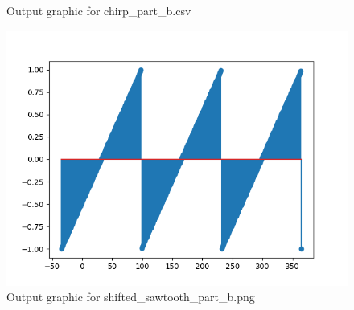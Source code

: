 \documentclass[10pt,a4paper, margin=1in]{article}
\begin{document}
\begin{enumerate}
\begin{enumerate}
\begin{figure}[H]
                        \caption{Output graphic for chirp\_part\_b.csv}
                    \end{figure}
                    \begin{figure}[H]
                        \centering
                        \includegraphics[scale=0.75]{shifted_sawtooth_part_b.png}
                        \caption{Output graphic for shifted\_sawtooth\_part\_b.png}
                    \end{figure}
          \end{enumerate}

\end{enumerate}
\end{document}

